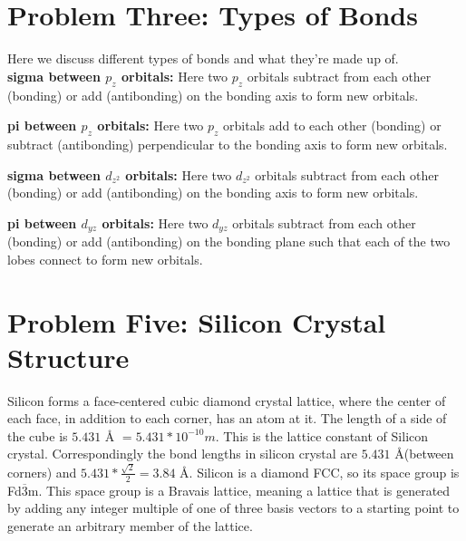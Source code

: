 \documentclass[10pt]{article} %
\begin{document}
\section{Problem Three: Types of Bonds}
Here we discuss different types of bonds and what they're made up of.\\

\textbf{sigma between $p_z$ orbitals: } Here two $p_z$ orbitals subtract from
each other (bonding) or add (antibonding) on the bonding axis to form new orbitals.\\
\vspace{3cm}

\textbf{pi between $p_z$ orbitals: } Here two $p_z$ orbitals add to each other (bonding)
or subtract (antibonding) perpendicular to the bonding axis to form new orbitals.\\
\vspace{3cm}

\textbf{sigma between $d_{z^2}$ orbitals: } Here two $d_{z^2}$ orbitals subtract from each other
(bonding) or add (antibonding) on the bonding axis to form new orbitals.\\
\vspace{3cm}

\textbf{pi between $d_{yz}$ orbitals: } Here two $d_{yz}$ orbitals subtract from each other
(bonding) or add (antibonding) on the bonding plane such that each of the two lobes
connect to form new orbitals.\\
\vspace{3cm}

\section{Problem Five: Silicon Crystal Structure}
Silicon forms a face-centered cubic diamond crystal lattice, where the center of each face, in
addition to each corner, has an atom at it. The length of a side of the cube is $5.431$ \AA
$= 5.431 * 10^{-10}m$. This is the lattice constant of Silicon crystal. Correspondingly the
bond lengths in silicon crystal are $5.431$ \AA (between corners) and
$5.431 * \frac{\sqrt{2}}{2} = 3.84$ \AA.
\hspace{2cm}
Silicon is a diamond FCC, so its space group is Fd$\overline{3}$m. This space group is a
Bravais lattice, meaning a lattice that is generated by adding any integer multiple of one
of three basis vectors to a starting point to generate an arbitrary member of the lattice.\\
\end{document}
